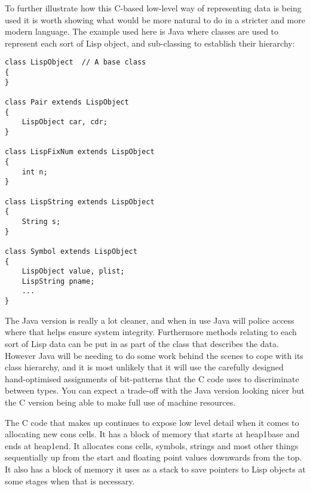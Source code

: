 To further illustrate how this C-based low-level way of representing data
is being used it is worth showing what would be more natural to do in a
stricter and more modern language. The example used here is Java where
classes are used to represent each sort of Lisp object, and sub-classing
to establish their hierarchy:
{\small\begin{verbatim}
class LispObject  // A base class
{
}

class Pair extends LispObject
{
    LispObject car, cdr;
}

class LispFixNum extends LispObject
{
    int n;
}

class LispString extends LispObject
{
    String s;
}

class Symbol extends LispObject
{
    LispObject value, plist;
    LispString pname;
    ...
}
\end{verbatim}}

The Java version is really a lot cleaner, and when in use Java will police
access where that helps ensure system integrity. Furthermore methods relating
to each sort of Lisp data can be put in as part of the class that describes
the data. However Java will be needing to do some work behind the scenes to
cope with its class hierarchy, and it is most unlikely that it will use
the carefully designed hand-optimised assignments of bit-patterns that the
C code uses to discriminate between types. You can expect a trade-off with
the Java version looking nicer but the C version being able to make full
use of machine resources.

The C code that makes up \vsl{} continues to expose low level detail when it
comes to allocating new {\tx cons} cells. It has a block of memory that
starts at {\tx heap1base} and ends at {\tx heap1end}. It allocates
{\tx cons} cells, symbols, strings and most other things sequentially up
from the start and floating point values downwards from the top. It also
has a block of memory it uses as a stack to save pointers to Lisp objects
at some stages when that is necessary.

